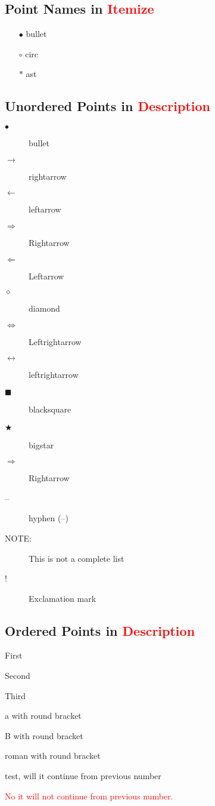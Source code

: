 \documentclass[a4paper, 10pt]{book}
\begin{document}
\subsection{Point Names in \textcolor{red}{Itemize}}
\begin{itemize}
	\item[$\bullet$] bullet
	\item[$\circ$] circ
	\item[$\ast$] ast
\end{itemize}

\subsection{Unordered Points in \textcolor{red}{Description}}
\begin{description}
	\item[$\bullet$] bullet
	\item[$\rightarrow$] rightarrow
	\item[$\leftarrow$] leftarrow
	\item[$\Rightarrow$] Rightarrow
	\item[$\Leftarrow$] Leftarrow
	\item[$\diamond$] diamond
	\item[$\Leftrightarrow$] Leftrightarrow
	\item[$\leftrightarrow$] leftrightarrow
	\item[$\blacksquare$] blacksquare
	\item[$\bigstar$] bigstar
	\item[$\Rightarrow$] Rightarrow
	\item[--] hyphen (--)
	\item[NOTE:] This is not a complete list
	\item[!]  Exclamation mark
\end{description}

\subsection{Ordered Points in \textcolor{red}{Description}}
\begin{description}
	\item[1.] First
	\item[2] Second
	\item[(3)] Third
	\item[(a)] a with round bracket
	\item[(B)] B with round bracket
	\item[(i)] roman with round bracket
	\item test, will it continue from previous number
	\item[!] \textcolor{red}{No it will not continue from previous number.}
\end{description}
\end{document}
